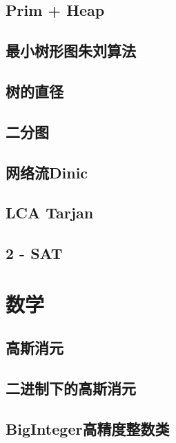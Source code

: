 \documentclass[a4paper, 12pt]{article}
\begin{document}
\subsection{Prim + Heap}

\subsection{最小树形图朱刘算法}

\subsection{树的直径}

\subsection{二分图}

\subsection{网络流Dinic}

\subsection{LCA Tarjan}

\subsection{2 - SAT}



\section{数学}
\subsection{高斯消元}

\subsection{二进制下的高斯消元}

\subsection{BigInteger高精度整数类}

\end{document}
